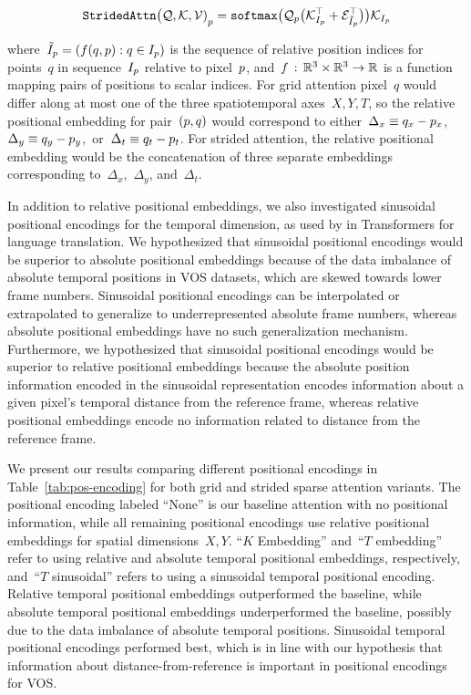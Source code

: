 \begin{equation}
        \mathtt{StridedAttn}{\big(\mathcal{Q}, \mathcal{K}, \mathcal{V})}_p{} = \mathtt{softmax}\big(\mathcal{Q}_p{} \big(\mathcal{K}^\top_{I_p} + \mathcal{E}^\top_{\tilde{I}_p}\big)\big)\mathcal{K}_{I_p}
\end{equation}

\noindent where~$\tilde{I}_p{} = (f(q, p) : q \in I_p)$
is the sequence of relative position indices for points~$q$ in
sequence~$I_p$ relative to pixel~$p$,
and~$f \,:\, \mathbb{R}^3\times \mathbb{R}^3 \rightarrow \mathbb{R}$ is a function mapping
pairs of positions to scalar indices.
For grid attention pixel~$q$ would differ along at most one of the
three spatiotemporal axes~$X, Y, T$, so the relative positional embedding for
pair~$(p, q)$ would correspond to
either~$\Delta_x \equiv q_x - p_x$,
$\Delta_y \equiv q_y - p_y$,~or~$\Delta_t \equiv q_t - p_t$.
For strided attention, the relative positional embedding would be the
concatenation of three separate embeddings corresponding
to~$\Delta_x$,~$\Delta_y$, and~$\Delta_t$.

In addition to relative positional embeddings, we also investigated sinusoidal
positional encodings for the temporal dimension, as used by
\citet{vaswani2017attention} in Transformers for language translation.
We hypothesized that sinusoidal positional encodings would be superior to
absolute positional embeddings because of the data imbalance of absolute
temporal positions in VOS datasets, which are skewed towards lower frame
numbers.
Sinusoidal positional encodings can be interpolated or extrapolated to
generalize to underrepresented absolute frame numbers, whereas absolute
positional embeddings have no such generalization mechanism.
Furthermore, we hypothesized that sinusoidal positional encodings would be
superior to relative positional embeddings because the absolute position
information encoded in the sinusoidal representation encodes information about
a given pixel's temporal distance from the reference frame, whereas relative
positional embeddings encode no information related to distance from the
reference frame.

We present our results comparing different positional encodings in
Table~\ref{tab:pos-encoding} for both grid and strided sparse attention
variants.
The positional encoding labeled ``None'' is our baseline attention with no
positional information, while all remaining positional encodings use relative
positional embeddings for spatial dimensions~$X, Y$.
``$K$ Embedding'' and~``$T$ embedding'' refer to using relative and absolute
temporal positional embeddings, respectively, and~``$T$ sinusoidal'' refers to
using a sinusoidal temporal positional encoding.
Relative temporal positional embeddings outperformed the baseline, while
absolute temporal positional embeddings underperformed the baseline, possibly
due to the data imbalance of absolute temporal positions.
Sinusoidal temporal positional encodings performed best, which is in line with
our hypothesis that information about distance-from-reference is important in
positional encodings for VOS\@.

